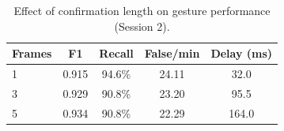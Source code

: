 \begin{table}[t]
\centering
\caption{Effect of confirmation length on gesture performance (Session 2).}
\label{tab:pinch-ablation}
\footnotesize
\setlength{\tabcolsep}{3pt}
\begin{tabular}{lcccc}
\hline
Frames & F1 & Recall & False/min & Delay (ms) \\
\hline
1 & 0.915 & 94.6\% & 24.11 & 32.0 \\
3 & 0.929 & 90.8\% & 23.20 & 95.5 \\
5 & 0.934 & 90.8\% & 22.29 & 164.0 \\
\hline
\end{tabular}
\end{table}
